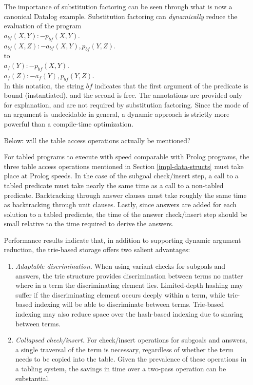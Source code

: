 \begin{example} \rm \label{canon-proj}
The importance of substitution factoring can be seen
through what is now a canonical Datalog example.  Substitution
factoring can {\em dynamically} reduce the evaluation of the program
\ \\
\tab $ a_{bf}(X,Y):- p_{bf}(X,Y).       $
\ \\
\tab $a_{bf}(X,Z):- a_{bf}(X,Y), p_{bf}(Y,Z).$
\ \\
to 
\ \\
\tab $a_{f}(Y):- p_{bf}(X,Y).$
\ \\
\tab $a_{f}(Z):- a_{f}(Y), p_{bf}(Y,Z).$
\ \\
In this notation, the string $bf$ indicates that the first argument of
the predicate is bound (instantiated), and the second is free.  The
annotations are provided only for explanation, and are not required by
substitution factoring.  Since the mode of an argument is undecidable
in general, a dynamic approach is strictly more powerful than a
compile-time optimization.
\end{example}

Below: will the table access operations actually be mentioned?

For tabled programs to execute with speed comparable with Prolog
programs, the three table access operations mentioned in Section
\ref{impl-data-structs} must take place at Prolog speeds.
In the case of the subgoal check/insert step, a call to a tabled
predicate must take nearly the same time as a call to a non-tabled
predicate.  Backtracking through answer clauses must take roughly the
same time as backtracking through unit clauses.  Lastly, since answers
are added for each solution to a tabled predicate, the time of the
answer check/insert step should be small relative to the time required
to derive the answers.

Performance results indicate that, in addition to supporting dynamic
argument reduction, the trie-based storage offers two salient
advantages:
\begin{enumerate}
\item 
{\em Adaptable discrimination.} When using variant checks for subgoals
and answers, the trie structure provides discrimination between terms
no matter where in a term the discriminating element lies.
Limited-depth hashing may suffer if the discriminating element occurs
deeply within a term, while trie-based indexing will be able to
discriminate between terms.  Trie-based indexing may also reduce space
over the hash-based indexing due to sharing between terms.
\item 
{\em Collapsed check/insert.} For check/insert operations for subgoals
and answers, a single traversal of the term is necessary, regardless
of whether the term needs to be copied into the table.  Given the
prevalence of these operations in a tabling system, the savings in
time over a two-pass operation can be substantial.
\end{enumerate}

